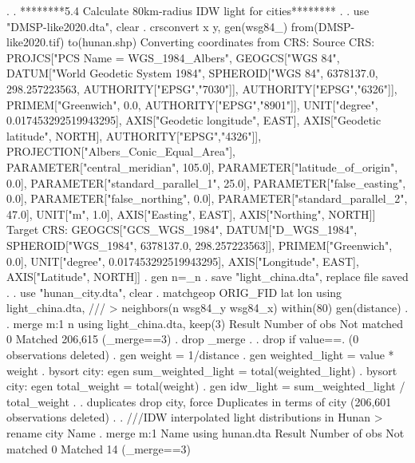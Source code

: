 . 
. ********5.4 Calculate 80km-radius IDW light for cities********
. 
. use "DMSP-like2020.dta", clear
{\smallskip}
. crsconvert x y, gen(wsg84_) from(DMSP-like2020.tif) to(hunan.shp)
Converting coordinates from CRS:
Source CRS: PROJCS["PCS Name = WGS_1984_Albers", 
  GEOGCS["WGS 84", 
    DATUM["World Geodetic System 1984", 
      SPHEROID["WGS 84", 6378137.0, 298.257223563, AUTHORITY["EPSG","7030"]], 
      AUTHORITY["EPSG","6326"]], 
    PRIMEM["Greenwich", 0.0, AUTHORITY["EPSG","8901"]], 
    UNIT["degree", 0.017453292519943295], 
    AXIS["Geodetic longitude", EAST], 
    AXIS["Geodetic latitude", NORTH], 
    AUTHORITY["EPSG","4326"]], 
  PROJECTION["Albers_Conic_Equal_Area"], 
  PARAMETER["central_meridian", 105.0], 
  PARAMETER["latitude_of_origin", 0.0], 
  PARAMETER["standard_parallel_1", 25.0], 
  PARAMETER["false_easting", 0.0], 
  PARAMETER["false_northing", 0.0], 
  PARAMETER["standard_parallel_2", 47.0], 
  UNIT["m", 1.0], 
  AXIS["Easting", EAST], 
  AXIS["Northing", NORTH]]
Target CRS: GEOGCS["GCS_WGS_1984", 
  DATUM["D_WGS_1984", 
    SPHEROID["WGS_1984", 6378137.0, 298.257223563]], 
  PRIMEM["Greenwich", 0.0], 
  UNIT["degree", 0.017453292519943295], 
  AXIS["Longitude", EAST], 
  AXIS["Latitude", NORTH]]
{\smallskip}
. gen n=_n
{\smallskip}
. save "light_china.dta", replace
file{} saved
{\smallskip}
. 
. use "hunan_city.dta", clear
{\smallskip}
. matchgeop ORIG_FID lat lon using light_china.dta, ///
>                neighbors(n wsg84_y wsg84_x) within(80) gen(distance)
{\smallskip}
. 
. merge m:1 n using light_china.dta, keep(3)
{\smallskip}
    Result                      Number of obs
    Not matched                             0
    Matched                           206,615  (_merge==3)
{\smallskip}
. drop _merge
{\smallskip}
. 
. drop if value==.
(0 observations deleted)
{\smallskip}
. gen weight  = 1/distance
{\smallskip}
. gen weighted_light = value * weight
{\smallskip}
. bysort city: egen sum_weighted_light = total(weighted_light)
{\smallskip}
. bysort city: egen total_weight = total(weight)
{\smallskip}
. gen idw_light = sum_weighted_light / total_weight
{\smallskip}
. 
. duplicates drop city, force
{\smallskip}
Duplicates in terms of city
{\smallskip}
(206,601 observations deleted)
{\smallskip}
. 
. ///IDW interpolated light distributions in Hunan
> rename city Name
{\smallskip}
. merge m:1 Name using hunan.dta
{\smallskip}
    Result                      Number of obs
    Not matched                             0
    Matched                                14  (_merge==3)

